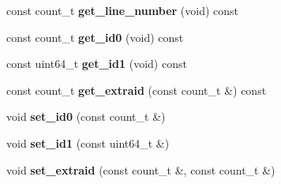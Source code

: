 \begin{DoxyCompactItemize}
\item 
\hypertarget{classmap__file_a6ecbe2a0487193db626625b86cbdcb15}{const count\-\_\-t {\bfseries get\-\_\-line\-\_\-number} (void) const }\label{classmap__file_a6ecbe2a0487193db626625b86cbdcb15}

\item 
\hypertarget{classmap__file_a312bd91ad27f7cd1071252c9bd064fe3}{const count\-\_\-t {\bfseries get\-\_\-id0} (void) const }\label{classmap__file_a312bd91ad27f7cd1071252c9bd064fe3}

\item 
\hypertarget{classmap__file_a50ab51a238ec4d4bd2e97a8d227473e7}{const uint64\-\_\-t {\bfseries get\-\_\-id1} (void) const }\label{classmap__file_a50ab51a238ec4d4bd2e97a8d227473e7}

\item 
\hypertarget{classmap__file_a233e510b6acba469c5ee31f67f2c1c2e}{const count\-\_\-t {\bfseries get\-\_\-extraid} (const count\-\_\-t \&) const }\label{classmap__file_a233e510b6acba469c5ee31f67f2c1c2e}

\item 
\hypertarget{classmap__file_a52b864d939aa5ba683422d0abc741946}{void {\bfseries set\-\_\-id0} (const count\-\_\-t \&)}\label{classmap__file_a52b864d939aa5ba683422d0abc741946}

\item 
\hypertarget{classmap__file_a61b0dac02a3db5ba628037a2aa79f38d}{void {\bfseries set\-\_\-id1} (const uint64\-\_\-t \&)}\label{classmap__file_a61b0dac02a3db5ba628037a2aa79f38d}

\item 
\hypertarget{classmap__file_a769ad6ca0043709bf535fbe4acb19e15}{void {\bfseries set\-\_\-extraid} (const count\-\_\-t \&, const count\-\_\-t \&)}\label{classmap__file_a769ad6ca0043709bf535fbe4acb19e15}

\end{DoxyCompactItemize}
